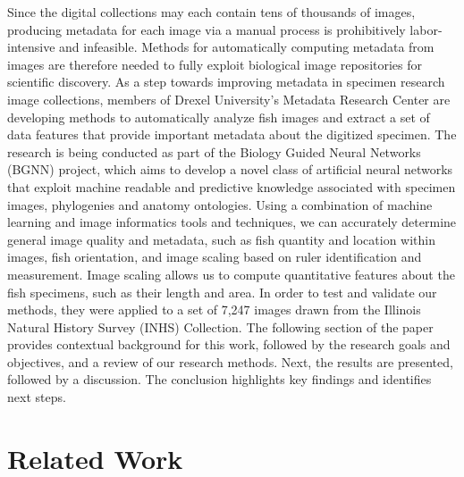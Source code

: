 \documentclass[conference]{IEEEtran}
\begin{document}
Since the digital collections may each contain tens of thousands of images, producing metadata for each image via a manual process is prohibitively labor-intensive and infeasible. Methods for automatically computing metadata from images are therefore needed to fully exploit biological image repositories for scientific discovery.
As a step towards improving metadata in specimen research image collections, members of Drexel University's Metadata Research Center are developing methods to automatically analyze fish images and
extract a set of data features that provide important metadata about the
digitized specimen.
The research is being conducted as part of the Biology Guided Neural Networks (BGNN) project, which aims to develop a novel class of artificial neural networks that exploit machine readable and predictive knowledge associated with specimen images, phylogenies and anatomy ontologies.
Using a combination of machine learning and image informatics tools and techniques, we can accurately determine general image quality and metadata, such as fish quantity and location within images, fish orientation, and
image scaling based on ruler identification and measurement. Image scaling
allows us to compute quantitative features about the fish specimens, such
as their length and area.  In order to test and validate our methods, they
were  applied to a set of 7,247
images drawn from the Illinois Natural History Survey (INHS) Collection.
The following section of the paper provides contextual background for this work, followed by the research goals and objectives, and a review of our research methods. Next, the results are presented, followed by a discussion. The conclusion highlights key findings and identifies next steps.

\section{Related Work}
\end{document}
